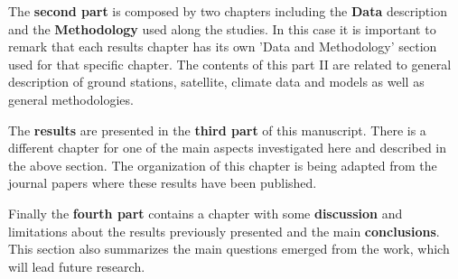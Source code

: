 The \textbf{second part} is composed by two chapters including the \textbf{Data} description and the \textbf{Methodology} used along the studies. In this case it is important to remark that each results chapter has its own 'Data and Methodology' section used for that specific chapter. The contents of this part II are related to general description of ground stations, satellite, climate data and models as well as general methodologies.

The \textbf{results} are presented in the \textbf{third part} of this manuscript. There is a different chapter for one of the main aspects investigated here and described in the above section. The organization of this chapter is being adapted from the journal papers where these results have been published.

Finally the \textbf{fourth part} contains a chapter with some \textbf{discussion} and limitations about the results previously presented and the main \textbf{conclusions}. This section also summarizes the main questions emerged from the work, which will lead future research.


